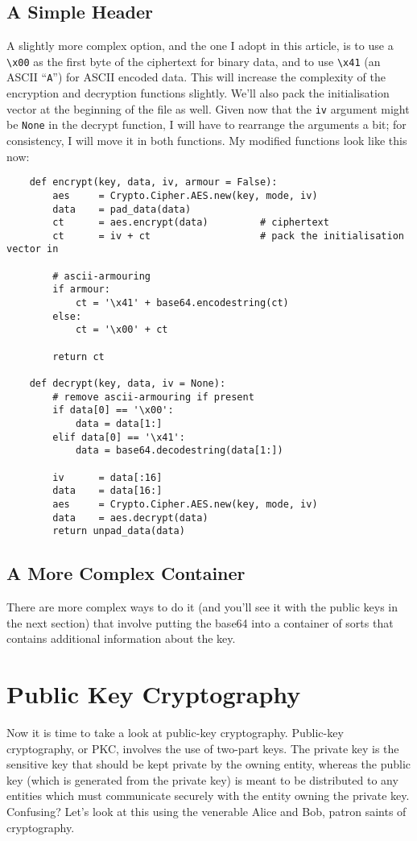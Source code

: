 \documentclass[letterpaper,10pt]{article}
\begin{document}
\subsection{A Simple Header}
A slightly more complex option, and the one I adopt in this article,
is to use a \verb|\x00| as the first byte of the ciphertext for binary
data, and to use \verb|\x41| (an ASCII ``\verb|A|'') for ASCII encoded
data. This will increase the complexity of the encryption and
decryption functions slightly. We'll also pack the initialisation
vector at the beginning of the file as well. Given now that the
\verb|iv| argument might be \verb|None| in the decrypt function, I
will have to rearrange the arguments a bit; for consistency, I will
move it in both functions.  My modified functions look like this now:

\begin{verbatim}
    def encrypt(key, data, iv, armour = False):
        aes     = Crypto.Cipher.AES.new(key, mode, iv)
        data    = pad_data(data)
        ct      = aes.encrypt(data)         # ciphertext
        ct      = iv + ct                   # pack the initialisation vector in
    
        # ascii-armouring
        if armour:
            ct = '\x41' + base64.encodestring(ct)
        else:
            ct = '\x00' + ct

        return ct

    def decrypt(key, data, iv = None):
        # remove ascii-armouring if present
        if data[0] == '\x00':
            data = data[1:]
        elif data[0] == '\x41':
            data = base64.decodestring(data[1:])

        iv      = data[:16]
        data    = data[16:]
        aes     = Crypto.Cipher.AES.new(key, mode, iv)
        data    = aes.decrypt(data)
        return unpad_data(data)
\end{verbatim}

\subsection{A More Complex Container}
There are more complex ways to do it (and you'll see it with the public keys 
in the next section) that involve putting the base64 into a container of sorts
that contains additional information about the key. 


\section{Public Key Cryptography}
Now it is time to take a look at public-key cryptography. Public-key 
cryptography, or PKC, involves the use of two-part keys. The private key is
the sensitive key that should be kept private by the owning entity, whereas the
public key (which is generated from the private key) is meant to be distributed
to any entities which must communicate securely with the entity owning the 
private key. Confusing? Let's look at this using the venerable Alice and Bob,
patron saints of cryptography.
\end{document}
